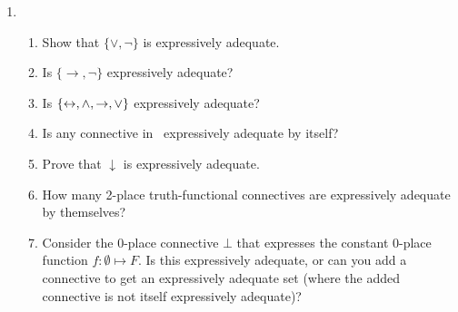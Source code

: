 {\begin{enumerate}
\item \begin{enumerate}

	\item Show that $\{\vee,\neg\}$ is expressively adequate.
	\item Is $\{\to,\neg\}$ expressively adequate?
	\item Is $\{\leftrightarrow,\wedge,\to,\vee\}$ expressively adequate?
	\item Is any connective in \lone\ expressively adequate by itself?
	\item Prove that $\downarrow$ is expressively adequate.
	\item How many 2-place truth-functional connectives are expressively adequate by themselves?
	\item Consider the 0-place connective $\bot$ that expresses the constant 0-place function $f: \emptyset \mapsto F$. Is this expressively adequate, or can you add a connective to get an expressively adequate set (where the added connective is not itself expressively adequate)? 
\end{enumerate}


\end{enumerate}}
